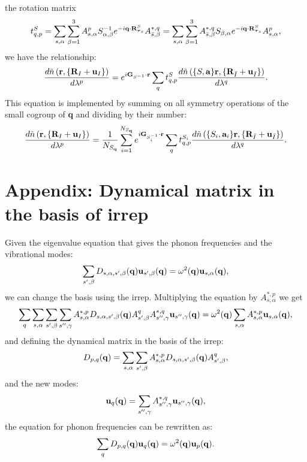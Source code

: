 \documentclass[12pt,a4paper,twoside]{report}
\begin{document}
the rotation matrix
\begin{equation}
t_{q,p}^S=
\sum_{s,\alpha}
\sum_{\beta=1}^3 A^p_{s,\alpha} S^{-1}_{\alpha,\beta} e^{-i{\bf q}\cdot {\bf R}^S_{{\boldsymbol{\tau}_s}}} A^{*,q}_{\bar s,\beta} = \sum_{s,\alpha}
\sum_{\beta=1}^3 A^{*,q}_{\bar s,\beta} S_{\beta,\alpha} e^{-i{\bf q}\cdot {\bf R}^S_{{\boldsymbol{\tau}_s}}} A^p_{s,\alpha} ,
\end{equation}
we have the relationship:
\begin{equation}
{d \tilde n\left({\bf r}, \{{\bf R}_I + {\bf u}_I\}\right) \over d \lambda^p} = e^{i{\bf G}_{S^{-1}} \cdot {\bf r}}
\sum_q t_{q,p}^S {d \tilde n\left(\{S,{\bf a}\} {\bf r}, \{{\bf R}_{\bar I} + {\bf u}_{\bar I}\}\right) \over d \lambda^q}. 
\end{equation}
This equation is implemented by summing on all symmetry operations of the small cogroup of
{\bf q} and dividing by their number:
\begin{equation}
{d \tilde n\left({\bf r}, \{{\bf R}_I + {\bf u}_I\}\right) \over d \lambda^p} = {1\over N_{S_{\bf q}}} \sum_{i=1}^{N_{S_{\bf q}}} e^{i{\bf G}_{S_i^{-1}} \cdot {\bf r}}
\sum_q t_{q,p}^{S_i} {d \tilde n\left(\{S_i,{\bf a}_i\} {\bf r}, \{{\bf R}_{\bar I} + {\bf u}_{\bar I}\}\right) \over d \lambda^q}. 
\end{equation}

\section{Appendix: Dynamical matrix in the basis of irrep}
Given the eigenvalue equation that gives the phonon frequencies and the vibrational modes:
\begin{equation}
\sum_{s',\beta} D_{s,\alpha,s',\beta}({\bf q})
{\bf u}_{s',\beta}({\bf q})
= \omega^2({\bf q}) {\bf u}_{s,\alpha}({\bf q}),
\end{equation}
we can change the basis using the irrep. Multiplying the equation by $A^{*,p}_{s,\alpha}$ we get
\begin{equation}
\sum_q \sum_{s,\alpha} \sum_{s',\beta} \sum_{s'',\gamma} A^{*,p}_{s,\alpha} D_{s,\alpha,s',\beta}({\bf q})
A^{q}_{s',\beta} A^{*,q}_{s'',\gamma}
{\bf u}_{s'',\gamma}({\bf q})
= \omega^2({\bf q}) \sum_{s,\alpha} A^{*,p}_{s,\alpha}{\bf u}_{s,\alpha}({\bf q}),
\end{equation}
and defining the dynamical matrix in the basis of the irrep:
\begin{equation}
D_{p,q}({\bf q}) =\sum_{s,\alpha} \sum_{s',\beta} A^{*,p}_{s,\alpha} D_{s,\alpha,s',\beta}({\bf q}) A^{q}_{s',\beta},
\label{rotate_pattern_add}
\end{equation}
and the new modes:
\begin{equation}
{\bf u}_{q}({\bf q}) = \sum_{s'',\gamma} A^{*,q}_{s'',\gamma}
{\bf u}_{s'',\gamma}({\bf q}),
\end{equation}
the equation for phonon frequencies can be rewritten as:
\begin{equation}
\sum_q  D_{p,q}({\bf q})
{\bf u}_{q}({\bf q})
= \omega^2({\bf q}){\bf u}_{p}({\bf q}).
\end{equation}
\end{document}
